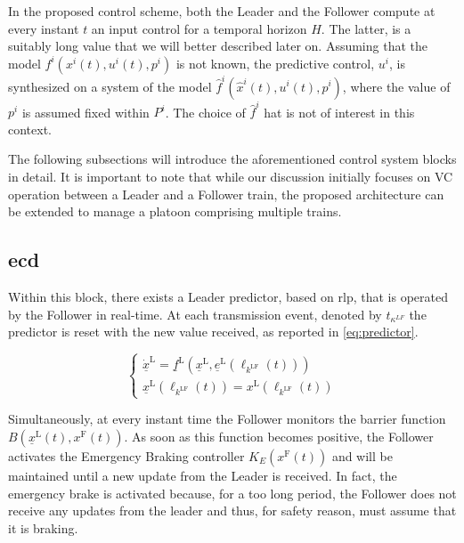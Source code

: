 In the proposed control scheme, both the Leader and the Follower compute at every instant $t$ an input control for a temporal horizon $H$. The latter, is a suitably long value that we will better described later on. Assuming that the model $f^i(x^i(t),u^i(t),p^i)$ is not known, the predictive control, $u^i$, is synthesized on a system of the model $\hat{f}^i(\hat{x}^i(t),u^i(t),p^i)$, where the value of $p^i$ is assumed fixed within $P^i$. The choice of $\hat{f}^i$ hat is not of interest in this context.

The following subsections will introduce the aforementioned control system blocks in detail. It is important to note that while our discussion initially focuses on VC operation between a Leader and a Follower train, the proposed architecture can be extended to manage a platoon comprising multiple trains.



\subsection{\gls{ecd}}
\label{subsec:EventCollisionDetector}
Within this block, there exists a Leader predictor, based on \gls{rlp}, that is operated by the Follower in real-time. At each transmission event, denoted by $t_{\kappa^{LF}}$ the predictor is reset with the new value received, as reported in \eqref{eq:predictor}.

\begin{equation*} \label{eq:predictor}
	\left\{\begin{array}{l}
		\underline{\dot{x}}^\mathrm{L}=\underline{f}^\mathrm{L}\left(\underline{x}^\mathrm{L}, \underline{e}^\mathrm{L}\left(\ell_{k^{\mathrm{L} \mathrm{F}}}(t)\right)\right) \\
		\underline{x}^\mathrm{L}\left(\ell_{k^{\mathrm{L} \mathrm{F}}}(t)\right)=x^\mathrm{L}\left(\ell_{k^{\mathrm{L} \mathrm{F}}}(t)\right)
	\end{array}\right.
\end{equation*}

Simultaneously, at every instant time the Follower monitors the barrier function $B\left(\underline{x}^\mathrm{L}\left(t\right),x^\mathrm{F}\left(t\right)\right)$. As soon as this function becomes positive, the Follower activates the Emergency Braking controller $K_E\left(x^\mathrm{F}(t)\right)$ and will be maintained until a new update from the Leader is received. In fact, the emergency brake is activated because, for a too long period, the Follower does not receive any updates from the leader and thus, for safety reason, must assume that it is braking.




